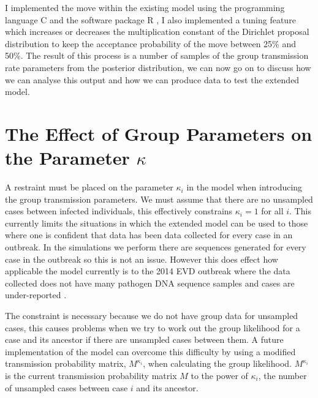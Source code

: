\documentclass[11pt,a4paper]{report}
\begin{document}
I implemented the move within the existing model using the programming language C and the software package R \citep{R14}, I also implemented a tuning feature which increases or decreases the multiplication constant of the Dirichlet proposal distribution to keep the acceptance probability of the move between 25\% and 50\%. The result of this process is a number of samples of the group transmission rate parameters from the posterior distribution, we can now go on to discuss how we can analyse this output and how we can produce data to test the extended model.

\section{The Effect of Group Parameters on the Parameter $\kappa$}
A restraint must be placed on the parameter $\kappa_i$ in the model when introducing the group transmission parameters. We must assume that there are no unsampled cases between infected individuals, this effectively constrains $\kappa_i=1$ for all $i$. This currently limits the situations in which the extended model can be used to those where one is confident that data has been data collected for every case in an outbreak. In the simulations we perform there are sequences generated for every case in the outbreak so this is not an issue. However this does effect how applicable the model currently is to the 2014 EVD outbreak where the data collected does not have many pathogen DNA sequence samples and cases are under-reported \citep{Ebola14}.

The constraint is necessary because we do not have group data for unsampled cases, this causes problems when we try to work out the group likelihood for a case and its ancestor if there are unsampled cases between them. A future implementation of the model can overcome this difficulty by using a modified transmission probability matrix, $M^{\kappa_i}$, when calculating the group likelihood. $M^{\kappa_i}$ is the current transmission probability matrix $M$ to the power of $\kappa_i$, the number of unsampled cases between case $i$ and its ancestor.
\end{document}

